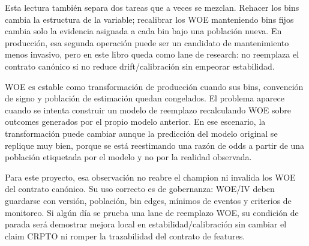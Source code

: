 \documentclass[
  spanish,
  11pt,
  letterpaper,
]{scrbook}
\theoremstyle{plain}
\theoremstyle{remark}
\begin{document}
\begin{tcolorbox}
Esta lectura también separa dos tareas que a veces se mezclan. Rehacer
los bins cambia la estructura de la variable; recalibrar los WOE
manteniendo bins fijos cambia solo la evidencia asignada a cada bin bajo
una población nueva. En producción, esa segunda operación puede ser un
candidato de mantenimiento menos invasivo, pero en este libro queda como
lane de research: no reemplaza el contrato canónico si no reduce
drift/calibración sin empeorar estabilidad.

\end{tcolorbox}

\begin{tcolorbox}[enhanced jigsaw, arc=.35mm, bottomrule=.15mm, bottomtitle=1mm, breakable, colback=white, colbacktitle=quarto-callout-warning-color!10!white, colframe=quarto-callout-warning-color-frame, coltitle=black, left=2mm, leftrule=.75mm, opacityback=0, opacitybacktitle=0.6, rightrule=.15mm, title=\textcolor{quarto-callout-warning-color}{\faExclamationTriangle}\hspace{0.5em}{Caveat de reemplazo WOE}, titlerule=0mm, toprule=.15mm, toptitle=1mm]

WOE es estable como transformación de producción cuando sus bins,
convención de signo y población de estimación quedan congelados. El
problema aparece cuando se intenta construir un modelo de reemplazo
recalculando WOE sobre outcomes generados por el propio modelo anterior.
En ese escenario, la transformación puede cambiar aunque la predicción
del modelo original se replique muy bien, porque se está reestimando una
razón de odds a partir de una población etiquetada por el modelo y no
por la realidad observada.

Para este proyecto, esa observación no reabre el champion ni invalida
los WOE del contrato canónico. Su uso correcto es de gobernanza: WOE/IV
deben guardarse con versión, población, bin edges, mínimos de eventos y
criterios de monitoreo. Si algún día se prueba una lane de reemplazo
WOE, su condición de parada será demostrar mejora local en
estabilidad/calibración sin cambiar el claim CRPTO ni romper la
trazabilidad del contrato de features.

\end{tcolorbox}
\end{document}
